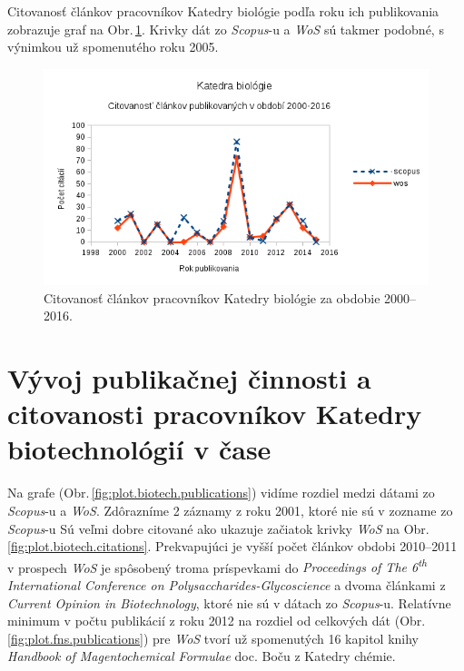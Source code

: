 Citovanosť článkov pracovníkov Katedry biológie podľa roku ich publikovania
zobrazuje graf na Obr.\,\ref{fig:plot.bio.citations}. Krivky dát zo
  \emph{Scopus}-u a \emph{WoS} sú takmer podobné, s výnimkou už spomenutého
   roku 2005.

\begin{figure}
  \centering
  \includegraphics[width=\textwidth]{obr/plot-bio-citations.png}
  \caption{Citovanosť článkov pracovníkov Katedry biológie za obdobie 2000--2016.}
  \label{fig:plot.bio.citations}
\end{figure}


\section{Vývoj publikačnej činnosti a citovanosti pracovníkov Katedry biotechnológií v čase}

Na grafe (Obr.\,\ref{fig:plot.biotech.publications}) vidíme rozdiel medzi dátami
zo \emph{Scopus}-u a \emph{WoS}. Zdôrazníme 2 záznamy z roku 2001, ktoré nie sú
v zozname zo \emph{Scopus}-u Sú veľmi dobre citované ako ukazuje začiatok krivky
\emph{WoS} na Obr.\,\ref{fig:plot.biotech.citations}. Prekvapujúci je vyšší
počet článkov obdobi 2010--2011 v prospech \emph{WoS} je spôsobený troma
príspevkami do \emph{Proceedings of The 6\textsuperscript{th} International
  Conference on Polysaccharides-Glycoscience} a dvoma článkami z \emph{Current
  Opinion in Biotechnology}, ktoré nie sú v dátach zo \emph{Scopus}-u. Relatívne
minimum v počtu publikácií z roku 2012 na rozdiel od celkových dát
(Obr.\,\ref{fig:plot.fns.publications}) pre \emph{WoS} tvorí už spomenutých 16
kapitol knihy \emph{Handbook of Magentochemical Formulae} doc. Boču z Katedry
chémie.

